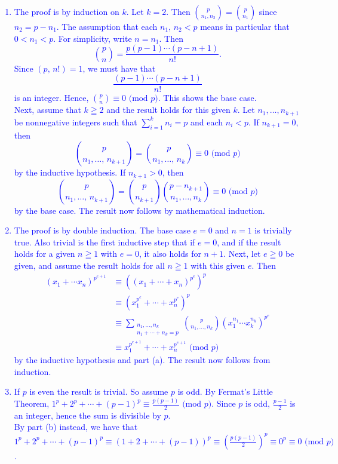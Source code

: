 \documentclass[a4paper,11pt]{article}
\theoremstyle{mythm}
\theoremstyle{mydef}
\newcommand{\blue}[1]{\textcolor{blue}{#1}}
\renewcommand{\pmod}[1]{\text{ (mod $#1$)}}
\begin{document}
\blue{
  \begin{enumerate}[{\bf (a)}]
  \item The proof is by induction on $k$. Let $k=2$. Then
    $\binom{p}{n_1,n_2}=\binom{p}{n_1}$ since $n_2=p-n_1$. The assumption that
    each $n_1,\,n_2 < p$ means in particular that $0 < n_1 < p$. For simplicity,
    write $n=n_1$. Then
    \[
      \binom{p}{n} = \frac{p(p-1)\cdots(p-n+1)}{n!}.
    \]
    Since $(p,\,n!)=1$, we must have that
    \[
      \frac{(p-1)\cdots(p-n+1)}{n!}
    \]
    is an integer. Hence, $\binom{p}{n} \equiv 0 \pmod{p}$. This shows the base
    case. \\
    Next, assume that $k \geqq 2$ and the result holds for this given $k$. Let
    $n_1,\dots,n_{k+1}$ be nonnegative integers such that $\sum_{i=1}^kn_i=p$
    and each $n_i < p$. If $n_{k+1}=0$, then
    \[
      \binom{p}{n_1,\dots,\,n_{k+1}} = \binom{p}{n_1,\dots,\,n_k} \equiv 0\pmod{p}
    \]
    by the inductive hypothesis. If $n_{k+1} > 0$, then
    \[
      \binom{p}{n_1,\dots,\,n_{k+1}}=\binom{p}{n_{k+1}}\binom{p-n_{k+1}}{n_1,\dots,n_k}
      \equiv 0\pmod{p}
    \]
    by the base case. The result now follows by mathematical induction.
  \item The proof is by double induction. The base case $e=0$ and $n=1$ is
    trivially true. Also trivial is the first inductive step that if $e=0$, and
    if the result holds for a given $n \geqq 1$ with $e=0$, it also holds for
    $n+1$. Next, let $e \geqq 0$ be given, and assume the result holds for all
    $n \geqq 1$ with this given $e$. Then
    \begin{align*}
      (x_1 + \cdots x_n)^{p^{e+1}} &\equiv ((x_1+\cdots+x_n)^{p^e})^p \\
      &\equiv (x_1^{p^e}+\cdots+x_n^{p^e})^p \\
      &\equiv \sum_{\begin{smallmatrix}n_1,\dots,n_k \\ n_1+\cdots+n_k=p\end{smallmatrix}}\binom{p}{n_1,\dots,n_k} (x_1^{n_1}\cdots x_k^{n_k})^{p^e} \\
      &\equiv x_1^{p^{e+1}}+\cdots+x_n^{p^{e+1}} \pmod{p}
    \end{align*}
    by the inductive hypothesis and part (a). The result now follows from
    induction.
  \item If $p$ is even the result is trivial. So assume $p$ is odd. By Fermat's
    Little Theorem, $1^p+2^p+\cdots+(p-1)^p\equiv \frac{p(p-1)}{2} \pmod{p}$.
    Since $p$ is odd, $\frac{p-1}{2}$ is an integer, hence the sum is divisible
    by $p$. \\
    By part (b) instead, we have that $1^p+2^p+\cdots+(p-1)^p \equiv
    (1+2+\cdots+(p-1))^p \equiv (\frac{p(p-1)}{2})^p \equiv 0^p \equiv 0
    \pmod{p}$.
  \end{enumerate}
}
\end{document}
